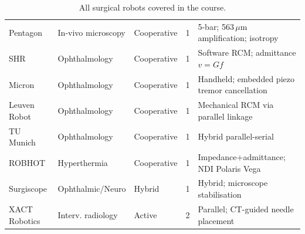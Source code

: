 \documentclass[11pt,a4paper,twoside]{report}
\begin{document}
\begin{table}[ht]
\begin{tabularx}{\textwidth}{@{}lXllX@{}}
Pentagon        & In-vivo microscopy & Cooperative   & 1     & 5-bar; 563\,$\mu$m amplification; isotropy \\
SHR             & Ophthalmology      & Cooperative   & 1     & Software RCM; admittance $v=Gf$ \\
Micron          & Ophthalmology      & Cooperative   & 1     & Handheld; embedded piezo tremor cancellation \\
Leuven Robot    & Ophthalmology      & Cooperative   & 1     & Mechanical RCM via parallel linkage \\
TU Munich       & Ophthalmology      & Cooperative   & 1     & Hybrid parallel-serial \\
ROBHOT          & Hyperthermia       & Cooperative   & 1     & Impedance+admittance; NDI Polaris Vega \\
Surgiscope      & Ophthalmic/Neuro   & Hybrid        & 1     & Hybrid; microscope stabilisation \\
XACT Robotics   & Interv. radiology  & Active        & 2     & Parallel; CT-guided needle placement \\
\bottomrule
\end{tabularx}
\caption{All surgical robots covered in the course.}
\end{table}
\end{document}
